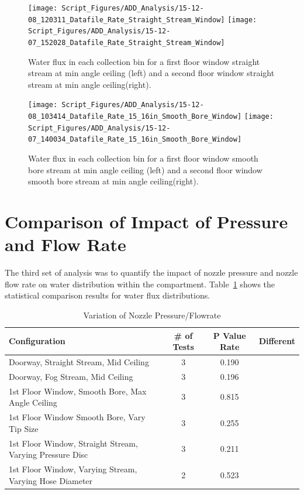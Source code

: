 \documentclass[12pt,oneside]{book}
\begin{document}
\begin{figure}[ht]
\texttt{[image: Script\_Figures/ADD\_Analysis/15-12-08\_120311\_Datafile\_Rate\_Straight\_Stream\_Window]}
\texttt{[image: Script\_Figures/ADD\_Analysis/15-12-07\_152028\_Datafile\_Rate\_Straight\_Stream\_Window]} \\ 
\caption[Water Flux for Straight Stream Min Angle Ceiling Varying Window Floor]{Water flux in each collection bin for a first floor window straight stream at min angle ceiling (left) and a second floor window straight stream at min angle ceiling(right).}
\label{fig:Window_First_Floor_Second_Floor_SS_MAC}
\end{figure}

\begin{figure}[ht]
\texttt{[image: Script\_Figures/ADD\_Analysis/15-12-08\_103414\_Datafile\_Rate\_15\_16in\_Smooth\_Bore\_Window]}
\texttt{[image: Script\_Figures/ADD\_Analysis/15-12-07\_140034\_Datafile\_Rate\_15\_16in\_Smooth\_Bore\_Window]} \\ 
\caption[Water Flux for Smooth Bore Min Angle Ceiling Varying Window Floor]{Water flux in each collection bin for a first floor window smooth bore stream at min angle ceiling (left) and a second floor window smooth bore stream at min angle ceiling(right).}
\label{fig:Window_First_Floor_Second_Floor_SB_MAC}
\end{figure}

\clearpage

\section{Comparison of Impact of Pressure and Flow Rate}
\label{sec:pressure}
The third set of analysis was to quantify the impact of nozzle pressure and nozzle flow rate on water distribution within the compartment. Table~\ref{tab:add_pressure} shows the statistical comparison results for water flux distributions. 

\begin{table}[!ht]
\centering
\footnotesize
\caption{Variation of Nozzle Pressure/Flowrate}
\label{tab:add_pressure}
\begin{tabular}{lccc}
\toprule[1.5pt]
Configuration & \# of Tests & P Value Rate & Different \\ 
\midrule
 Doorway, Straight Stream, Mid Ceiling                     & 3   & 0.190   &            \\
 Doorway, Fog Stream, Mid Ceiling                          & 3   & 0.196   &            \\
 1st Floor Window, Smooth Bore, Max Angle Ceiling          & 3   & 0.815   &            \\
 1st Floor Window Smooth Bore, Vary Tip Size               & 3   & 0.255   &            \\
 1st Floor Window, Straight Stream, Varying Pressure Disc  & 3   & 0.211   &            \\
 1st Floor Window, Varying Stream, Varying Hose Diameter   & 2   & 0.523   &            \\
\bottomrule[1.25pt]
\end{tabular}
\end{table}
\end{document}
